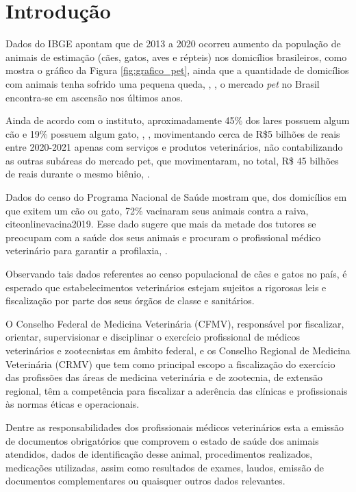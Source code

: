 \documentclass[
    12pt,               %
    openright,          %
    oneside,
    a4paper,            %
    BIBLATEX,           %
    TODO,               %
    english,            %
    brazil              %
    ]{ifsp-spo-inf-ctds}
\begin{document}
\chapter[Introdução]{Introdução} \label{intro}

    Dados do IBGE apontam que de 2013 a 2020 ocorreu aumento da população de animais de estimação (cães, gatos, aves e répteis) nos domicílios brasileiros, como mostra o gráfico da Figura \ref{fig:grafico_pet}, ainda que a quantidade de domicílios com animais tenha sofrido uma pequena queda, , , o mercado \emph{pet} no Brasil encontra-se em ascensão nos últimos anos.

    Ainda de acordo com o instituto, aproximadamente 45\% dos lares possuem algum cão e 19\% possuem algum gato, , , movimentando cerca de R\$5 bilhões de reais entre 2020-2021 apenas com serviços e produtos veterinários, não contabilizando as outras subáreas do mercado pet, que movimentaram, no total, R\$ 45 bilhões de reais durante o mesmo biênio, .

    Dados do censo do Programa Nacional de Saúde mostram que, dos domicílios em que exitem um cão ou gato, 72\% vacinaram seus animais contra a raiva, citeonline{vacina2019}. Esse dado sugere que mais da metade dos tutores se preocupam com a saúde dos seus animais e procuram o profissional médico veterinário para garantir a profilaxia, .

    Observando tais dados referentes ao censo populacional de cães e gatos no país, é esperado que estabelecimentos veterinários estejam sujeitos a rigorosas leis e fiscalização por parte dos seus órgãos de classe e sanitários.

    O Conselho Federal de Medicina Veterinária (CFMV), responsável por fiscalizar, orientar, supervisionar e disciplinar o exercício profissional de médicos veterinários e zootecnistas em âmbito federal, e os Conselho Regional de Medicina Veterinária (CRMV) que tem como principal escopo a fiscalização do exercício das profissões das áreas de medicina veterinária e de zootecnia, de extensão regional,  têm a competência para fiscalizar a aderência das clínicas e profissionais às normas éticas e operacionais.

    Dentre as responsabilidades dos profissionais médicos veterinários esta a emissão de documentos obrigatórios que comprovem o estado de saúde dos animais atendidos, dados de identificação desse animal, procedimentos realizados, medicações utilizadas, assim como resultados de exames, laudos, emissão de documentos complementares ou quaisquer outros dados relevantes.
\end{document}
